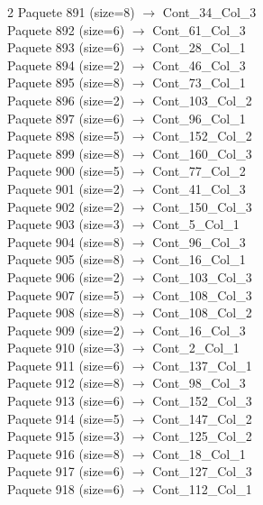 \begin{multicols}{2}
Paquete 891 (size=8) $\rightarrow$ Cont\_34\_Col\_3\\
Paquete 892 (size=6) $\rightarrow$ Cont\_61\_Col\_3\\
Paquete 893 (size=6) $\rightarrow$ Cont\_28\_Col\_1\\
Paquete 894 (size=2) $\rightarrow$ Cont\_46\_Col\_3\\
Paquete 895 (size=8) $\rightarrow$ Cont\_73\_Col\_1\\
Paquete 896 (size=2) $\rightarrow$ Cont\_103\_Col\_2\\
Paquete 897 (size=6) $\rightarrow$ Cont\_96\_Col\_1\\
Paquete 898 (size=5) $\rightarrow$ Cont\_152\_Col\_2\\
Paquete 899 (size=8) $\rightarrow$ Cont\_160\_Col\_3\\
Paquete 900 (size=5) $\rightarrow$ Cont\_77\_Col\_2\\
Paquete 901 (size=2) $\rightarrow$ Cont\_41\_Col\_3\\
Paquete 902 (size=2) $\rightarrow$ Cont\_150\_Col\_3\\
Paquete 903 (size=3) $\rightarrow$ Cont\_5\_Col\_1\\
Paquete 904 (size=8) $\rightarrow$ Cont\_96\_Col\_3\\
Paquete 905 (size=8) $\rightarrow$ Cont\_16\_Col\_1\\
Paquete 906 (size=2) $\rightarrow$ Cont\_103\_Col\_3\\
Paquete 907 (size=5) $\rightarrow$ Cont\_108\_Col\_3\\
Paquete 908 (size=8) $\rightarrow$ Cont\_108\_Col\_2\\
Paquete 909 (size=2) $\rightarrow$ Cont\_16\_Col\_3\\
Paquete 910 (size=3) $\rightarrow$ Cont\_2\_Col\_1\\
Paquete 911 (size=6) $\rightarrow$ Cont\_137\_Col\_1\\
Paquete 912 (size=8) $\rightarrow$ Cont\_98\_Col\_3\\
Paquete 913 (size=6) $\rightarrow$ Cont\_152\_Col\_3\\
Paquete 914 (size=5) $\rightarrow$ Cont\_147\_Col\_2\\
Paquete 915 (size=3) $\rightarrow$ Cont\_125\_Col\_2\\
Paquete 916 (size=8) $\rightarrow$ Cont\_18\_Col\_1\\
Paquete 917 (size=6) $\rightarrow$ Cont\_127\_Col\_3\\
Paquete 918 (size=6) $\rightarrow$ Cont\_112\_Col\_1\\

\end{multicols}
